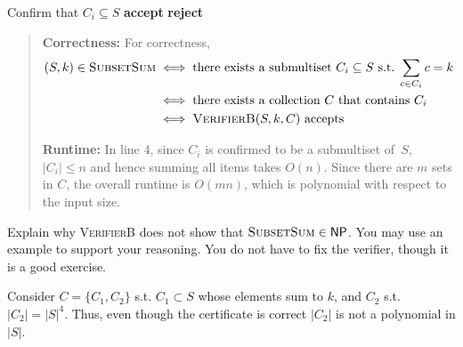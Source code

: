 \documentclass[12pt, letterpaper]{article}
\newcommand{\NP}{\mathsf{NP}}
\begin{document}
\begin{subproblem}{}
    \begin{center}
      \begin{minipage}{0.9\linewidth}
        \begin{algorithm}[H]
       \begin{algorithmic}[1]
          
            \State Confirm that $C_i \subseteq S$
             \textbf{accept} \EndIf
         \EndFor
         \State \textbf{reject}
         \EndFunction
       \end{algorithmic}
     \end{algorithm}  
     \end{minipage}
     \end{center}

    \begin{quote}
        \textbf{Correctness:} For correctness,
        \begin{align*}
            (S,k) \in \textsc{SubsetSum} &\iff \text{there exists a submultiset $C_i \subseteq S$ s.t. $\sum_{c \in C_i} c = k$} \\
            & \iff \text{there exists a collection $C$ that contains $C_i$}\\
            & \iff \textsc{VerifierB}(S,k,C) \text{ accepts}
        \end{align*}
      
        \textbf{Runtime:} In line 4, since $C_i$ is confirmed to be a submultiset of~$S$, $|C_i| \leq n$ and hence summing all items takes $O(n)$. Since there are $m$ sets in $C$, the overall runtime is $O(mn)$, which is polynomial with respect to the input size. 
    \end{quote}

      Explain why \textsc{VerifierB} does not show that $\SubsetSum \in \NP$. You may use an example to support your reasoning. You do not have to fix the verifier, though it is a good exercise. 
\end{subproblem}
\begin{problemproof}
    Consider $C=\{C_1,C_2\}$ s.t. $C_1 \subset S$ whose elements sum to $k$, and $C_2$ s.t. $|C_2|=|S|^4$. Thus, even though the certificate is correct $|C_2|$ is not a polynomial in $|S|$.
\end{problemproof}
\end{document}
